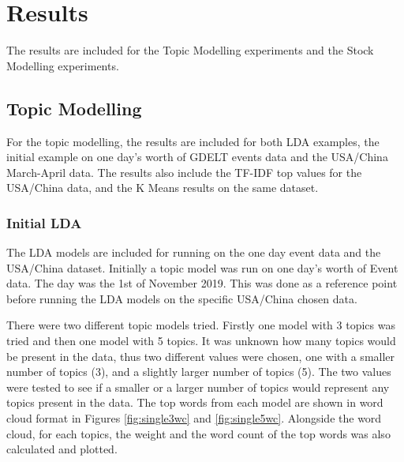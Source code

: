 \section{Results}
\label{results}
The results are included for the Topic Modelling experiments and the Stock Modelling experiments. 

\subsection{Topic Modelling}
For the topic modelling, the results are included for both LDA examples, the initial example on one day's worth of GDELT events data and the USA/China March-April data. The results also include the TF-IDF top values for the USA/China data, and the K Means results on the same dataset.

\subsubsection{Initial LDA}
The LDA models are included for running on the one day event data and the USA/China dataset. 
Initially a topic model was run on one day's worth of Event data. The day was the 1st of November 2019. This was done as a reference point before running the LDA models on the specific USA/China chosen data.

There were two different topic models tried. Firstly one model with 3 topics was tried and then one model with 5 topics. It was unknown how many topics would be present in the data, thus two different values were chosen, one with a smaller number of topics (3), and a slightly larger number of topics (5). The two values were tested to see if a smaller or a larger number of topics would represent any topics present in the data. The top words from each model are shown in word cloud format in Figures \ref{fig:single3wc} and \ref{fig:single5wc}. Alongside the word cloud, for each topics, the weight and the word count of the top words was also calculated and plotted. 
	
